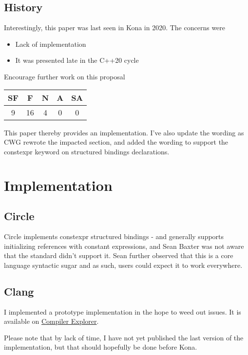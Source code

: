 \documentclass{wg21}
\begin{document}
\subsection{History}

Interestingly, this paper was last seen in Kona in 2020.
The concerns were
\begin{itemize}
    \item Lack of implementation
    \item It was presented late in the C++20 cycle
\end{itemize}


\begin{quoteblock}
Encourage further work on this proposal

\begin{tabular}{|c|c|c|c|c|}
    \hline
    SF & F & N & A & SA\\
    \hline
    9 & 16 & 4 & 0 & 0 \\
    \hline
\end{tabular}
\end{quoteblock}

This paper thereby provides an implementation.
I've also update the wording as CWG rewrote the impacted section, and added the wording to support the constexpr keyword
on structured bindings declarations.

\section{Implementation}

\subsection{Circle}

Circle implements constexpr structured bindings - and generally supports initializing references with constant expressions,
and Sean Baxter was not aware that the standard didn't support it.
Sean further observed that this is a core language syntactic sugar and as such, users could expect it to work everywhere.

\subsection{Clang}
I implemented a prototype implementation in the hope to weed out issues.
It is available on \href{https://godbolt.org/z/dWWxcEEf9}{Compiler Explorer}.

Please note that by lack of time, I have not yet published the last version of the implementation, but that should hopefully be
done before Kona.
\end{document}
